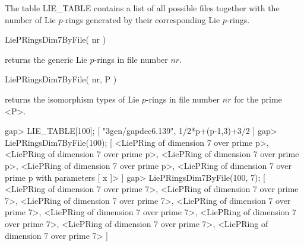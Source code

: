 The table LIE_TABLE contains a list of all possible files together with
the number of Lie $p$-rings generated by their corresponding Lie $p$-rings. 

\> LiePRingsDim7ByFile( nr )

returns the generic Lie $p$-rings in file number $nr$.

\> LiePRingsDim7ByFile( nr, P )

returns the isomorphism types of Lie $p$-rings in file number $nr$ for
the prime <P>.

\beginexample
gap> LIE_TABLE[100];
[ "3gen/gapdec6.139", 1/2*p+(p-1,3)+3/2 ]
gap> LiePRingsDim7ByFile(100);
[ <LiePRing of dimension 7 over prime p>, 
  <LiePRing of dimension 7 over prime p>, 
  <LiePRing of dimension 7 over prime p>,
  <LiePRing of dimension 7 over prime p>,
  <LiePRing of dimension 7 over prime p with parameters [ x ]> ]
gap> LiePRingsDim7ByFile(100, 7);
[ <LiePRing of dimension 7 over prime 7>, 
  <LiePRing of dimension 7 over prime 7>, 
  <LiePRing of dimension 7 over prime 7>, 
  <LiePRing of dimension 7 over prime 7>, 
  <LiePRing of dimension 7 over prime 7>, 
  <LiePRing of dimension 7 over prime 7>, 
  <LiePRing of dimension 7 over prime 7>, 
  <LiePRing of dimension 7 over prime 7> ]
\endexample

